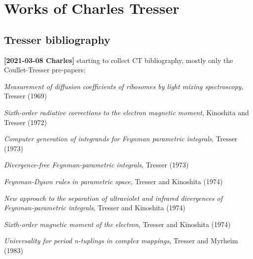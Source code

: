 
\chapter{Works of Charles Tresser}
\label{c-Tresser}

\section{Tresser bibliography}
\label{sect:Tresser}

{\bf [2021-03-08 Charles]}
starting to collect CT bibliography, mostly only the Coullet-Tresser
pre-papers:
\bigskip

{\em Measurement of diffusion coefficients of ribosomes by light mixing
spectroscopy},
{Tresser}
{(1969)}

{\em Sixth-order radiative corrections to the electron magnetic moment},
{Kinoshita and Tresser}
{(1972)}

{\em Computer generation of integrands for {Feynman} parametric integrals},
{Tresser}
{(1973)}

{\em Divergence-free {Feynman}-parametric integrals},
{Tresser}
{(1973)}

{\em {Feynman-Dyson} rules in parametric space},
{Tresser and Kinoshita}
{(1974)}

{\em New approach to the separation of ultraviolet and infrared
divergences of {Feynman}-parametric integrals},
{Tresser and Kinoshita}
{(1974)}

 {\em Sixth-order magnetic moment of the electron},
{Tresser and Kinoshita}
{(1974)}

{\em Universality for period n-tuplings in complex mappings},
{Tresser and Myrheim}
{(1983)}

